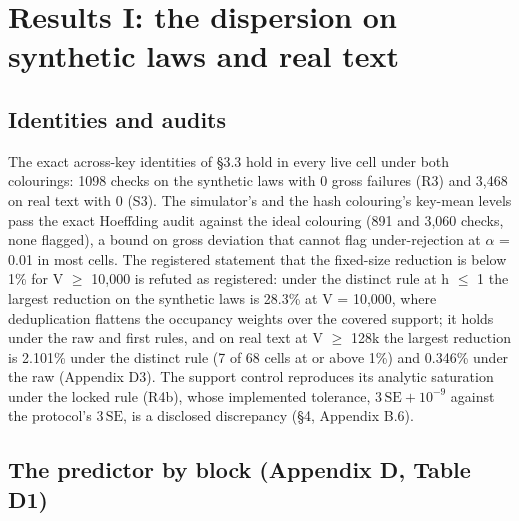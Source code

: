 \documentclass[11pt,letterpaper]{article}
\begin{document}
\hypertarget{results-i-the-dispersion-on-synthetic-laws-and-real-text}{%
\section{Results I: the dispersion on synthetic laws and real text}\label{results-i-the-dispersion-on-synthetic-laws-and-real-text}}

\hypertarget{identities-and-audits}{%
\subsection{Identities and audits}\label{identities-and-audits}}

The exact across-key identities of \S{}3.3 hold in every live cell under both colourings: 1098 checks on the synthetic laws with 0 gross failures (R3) and 3,468 on real text with 0 (S3). The simulator's and the hash colouring's key-mean levels pass the exact Hoeffding audit against the ideal colouring (891 and 3,060 checks, none flagged), a bound on gross deviation that cannot flag under-rejection at \ensuremath{\alpha} = 0.01 in most cells. The registered statement that the fixed-size reduction is below 1\% for V \ensuremath{\geq} 10,000 is refuted as registered: under the distinct rule at h \ensuremath{\leq} 1 the largest reduction on the synthetic laws is 28.3\% at V = 10,000, where deduplication flattens the occupancy weights over the covered support; it holds under the raw and first rules, and on real text at V \ensuremath{\geq} 128k the largest reduction is 2.101\% under the distinct rule (7 of 68 cells at or above 1\%) and 0.346\% under the raw (Appendix D3). The support control reproduces its analytic saturation under the locked rule (R4b), whose implemented tolerance, \(3\,\mathrm{SE} + 10^{-9}\) against the protocol's \(3\,\mathrm{SE}\), is a disclosed discrepancy (\S{}4, Appendix B.6).

\hypertarget{the-predictor-by-block-appendix-d-table-d1}{%
\subsection{The predictor by block (Appendix D, Table D1)}\label{the-predictor-by-block-appendix-d-table-d1}}
\end{document}
